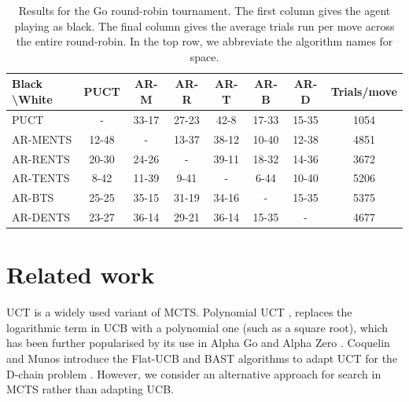 \documentclass{article}
\theoremstyle{plain}
\begin{document}
          	

        \begin{table}[]
        \centering   
		    \begin{tabular}{l|cccccc|c} 
		        \textbf{Black \textbackslash White}     & PUCT  & AR-M  & AR-R  & AR-T  & AR-B  & AR-D   & Trials/move\\ 
		        \hline
		                                PUCT            &   -   & 33-17 & 27-23 & 42-8  & 17-33 & 15-35  & 1054 \\
		                                AR-MENTS        & 12-48 &   -   & 13-37 & 38-12 & 10-40 & 12-38  & 4851\\
		                                AR-RENTS        & 20-30 & 24-26 &   -   & 39-11 & 18-32 & 14-36  & 3672 \\
		                                AR-TENTS        &  8-42 & 11-39 &  9-41 &   -   &  6-44 & 10-40  & 5206 \\
		                                AR-BTS          & 25-25 & 35-15 & 31-19 & 34-16 &   -   & 15-35  & 5375 \\
		                                AR-DENTS        & 23-27 & 36-14 & 29-21 & 36-14 & 15-35 &   -    & 4677 \\         
		    \end{tabular}
            \caption{Results for the Go round-robin tournament. The first column gives the agent playing as black. The final column gives the average trials run per move across the entire round-robin. In the top row, we abbreviate the algorithm names for space.\label{table:go_results}}
        \end{table}





\section{Related work}
    
    UCT \cite{kocsis2006uct,kocsis2006improved} is a widely used variant of MCTS. Polynomial UCT \cite{poly_uct2}, replaces the logarithmic term in UCB with a polynomial one (such as a square root), which has been further 
    popularised by its use in 
    Alpha Go and Alpha Zero \cite{silver2016mastering,silver2017mastering,silver2018general}. Coquelin and Munos introduce the Flat-UCB and BAST algorithms to adapt UCT for the D-chain problem \cite{coquelin2007_uct}. 
    However, we consider an alternative approach for search in MCTS rather than adapting UCB.
    
\end{document}
